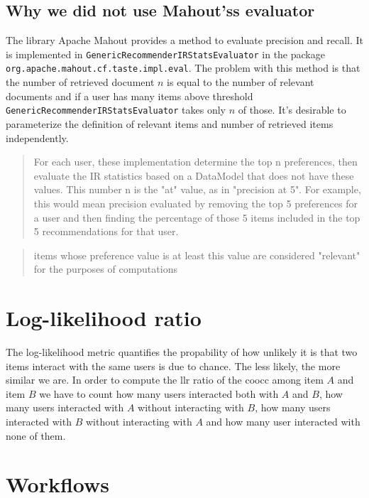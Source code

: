 \subsection{Why we did not use Mahout'ss evaluator}
\label{sec:mahouteval}

The library Apache Mahout provides a method to evaluate precision and recall. It is implemented in 
 \verb|GenericRecommenderIRStatsEvaluator| in the package \verb|org.apache.mahout.cf.taste.impl.eval|. The problem with this method is that the number of retrieved document $n$ is equal to the number of relevant documents and if a user has many items above threshold  \verb|GenericRecommenderIRStatsEvaluator| takes only $n$ of those. It's desirable to parameterize the definition of relevant items and number of retrieved items independently.

\begin{quote}
For each user, these implementation determine the top n preferences, then evaluate the IR statistics based on a DataModel that does not have these values. This number n is the "at" value, as in "precision at 5". For example, this would mean precision evaluated by removing the top 5 preferences for a user and then finding the percentage of those 5 items included in the top 5 recommendations for that user. 
\end{quote}

\begin{quote}
  items whose preference value is at least this value are considered "relevant" for the purposes of computations
\end{quote}

\section{Log-likelihood ratio}
\label{sec:llrratio}
The log-likelihood metric quantifies the propability of how
unlikely it is that two items interact with the same users is due to chance. The less likely, the more similar we are.
In order to compute the \gls{llr} ratio of the \gls{coocc} among item $A$ and item $B$ we have to count how many users interacted both with $A$ and $B$, how many users interacted with $A$ without interacting with $B$, how many users interacted with $B$ without interacting with $A$ and how many user interacted with none of them.


\section{Workflows}
\label{sec:workflows}

